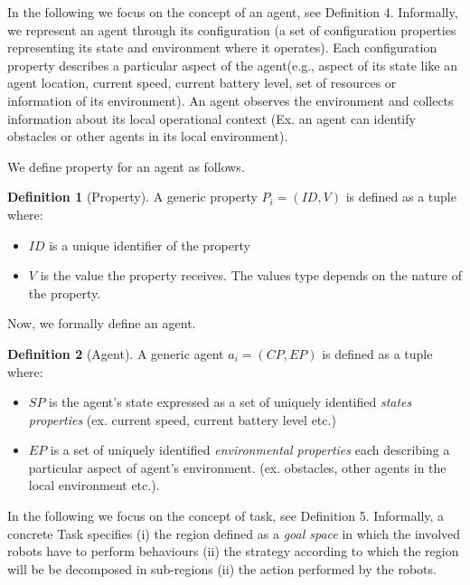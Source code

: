 \documentclass[journal]{IEEEtran}
\theoremstyle{definition}
\newtheorem{definition}{Definition}
\newcommand\patrizio[1]{\nb{Patrizio}{#1}}
\newcommand\ivano[1]{\nb{Ivano}{#1}}
\begin{document}
In  the  following  we  focus  on  the  concept  of  an agent,  see Definition 4. 
Informally, we represent an agent through its configuration (a set of configuration properties representing its state and environment where it operates). Each configuration property describes a particular aspect of the agent(e.g., aspect of its state like an agent location, current speed, current battery level, set of resources or information of its  environment). An agent observes the environment and collects information about its local operational context (Ex. an agent can identify obstacles or other agents in its local environment).

We define property for an agent as follows.

\begin{definition}[Property]
A generic property $P_i=(ID, V)$ is defined as a tuple where:
\begin{itemize}
\item $ID$ is a unique identifier of the property
\item $V$ is the value the property receives. The values type depends on the nature of the property.
\end{itemize}
\end{definition}

Now, we  formally define an agent. 

\begin{definition}[Agent]
A generic agent $a_i=(CP, EP)$ is defined as a tuple %
where:
\begin{itemize}
\item $SP$ is the agent's state expressed as a set of uniquely identified \textit{states properties} (ex. current speed, current battery level etc.)
\item $EP$ is a set of uniquely identified \textit{environmental properties} each describing a particular aspect of agent's environment. (ex. obstacles, other agents in the local environment etc.). 
\end{itemize}
\end{definition}

In the following we focus on the concept of task, see Definition
5. Informally, a concrete Task specifies (i) 
the region defined as a \textit{goal space} in which the involved robots have to perform behaviours 
(ii) the strategy according to which the region will be be  decomposed  in sub-regions 
(ii) the action performed by the robots.
\end{document}

